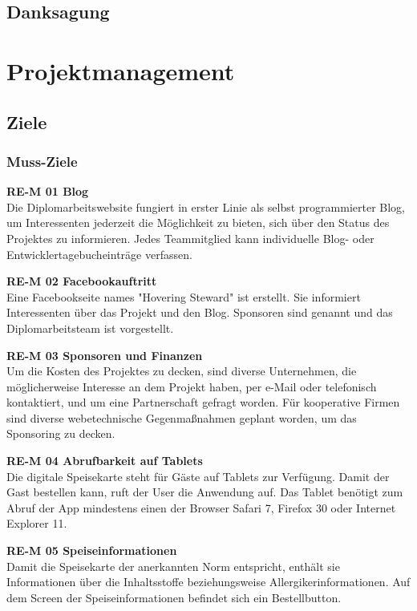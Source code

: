 \section{Danksagung}

\chapter{Projektmanagement}
\renewcommand{\kapitelautor}{Autor: Markus Kaiser}

\section{Ziele}

  \subsection{Muss-Ziele}
  \textbf{RE-M 01 Blog}\\
  Die Diplomarbeitswebsite fungiert in erster Linie als selbst programmierter Blog, um Interessenten
  jederzeit die Möglichkeit zu bieten, sich über den Status des Projektes zu informieren. Jedes Teammitglied
  kann individuelle Blog- oder Entwicklertagebucheinträge verfassen.

  \textbf{RE-M 02 Facebookauftritt}\\
  Eine Facebookseite names "Hovering Steward" ist erstellt. Sie informiert Interessenten über das
  Projekt und den Blog. Sponsoren sind genannt und das Diplomarbeitsteam ist vorgestellt.

  \textbf{RE-M 03 Sponsoren und Finanzen}\\
  Um die Kosten des Projektes zu decken, sind diverse Unternehmen, die möglicherweise Interesse an dem
  Projekt haben, per e-Mail oder telefonisch kontaktiert, und um eine Partnerschaft gefragt worden.
  Für kooperative Firmen sind diverse webetechnische Gegenmaßnahmen geplant worden, um das Sponsoring
  zu decken.

  \textbf{RE-M 04 Abrufbarkeit auf Tablets}\\
  Die digitale Speisekarte steht für Gäste auf Tablets zur Verfügung. Damit der Gast bestellen kann,
  ruft der User die Anwendung auf. Das Tablet benötigt zum Abruf der App mindestens einen der Browser
  Safari 7, Firefox 30 oder Internet Explorer 11.

  \textbf{RE-M 05 Speiseinformationen}\\
  Damit die Speisekarte der anerkannten Norm entspricht, enthält sie Informationen über die Inhaltsstoffe
  beziehungsweise Allergikerinformationen. Auf dem Screen der Speiseinformationen befindet sich ein
  Bestellbutton.

